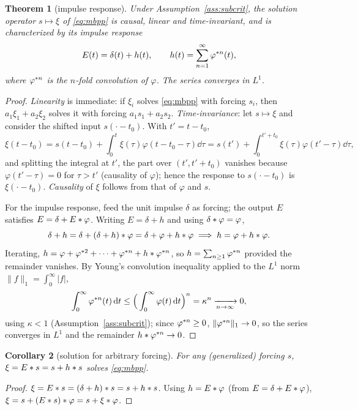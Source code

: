 \documentclass[11pt]{article}
\theoremstyle{plain}
\newtheorem{theorem}{Theorem}[section]
\newtheorem{corollary}[theorem]{Corollary}
\theoremstyle{definition}
\theoremstyle{remark}
\begin{document}
\begin{theorem}[impulse response]
\label{thm:impulse}
Under Assumption~\ref{ass:subcrit}, the solution operator $s\mapsto\xi$ of
\eqref{eq:mbpp} is causal, linear and time-invariant, and is characterized by its
impulse response
\begin{equation}
E(t)=\delta(t)+h(t),\qquad h(t)=\sum_{n=1}^\infty\varphi^{\ast n}(t),
\label{eq:impulse}
\end{equation}
where $\varphi^{\ast n}$ is the $n$-fold convolution of $\varphi$. The series
converges in $L^1$.
\end{theorem}
\begin{proof}
\emph{Linearity} is immediate: if $\xi_i$ solves \eqref{eq:mbpp} with forcing
$s_i$, then $a_1\xi_1+a_2\xi_2$ solves it with forcing $a_1s_1+a_2s_2$.
\emph{Time-invariance}: let $s\mapsto\xi$ and consider the shifted input
$s(\cdot-t_0)$. With $t'=t-t_0$,
\[
\xi(t-t_0)=s(t-t_0)+\int_0^t\xi(\tau)\varphi(t-t_0-\tau)\dd\tau
=s(t')+\int_0^{t'+t_0}\xi(\tau)\varphi(t'-\tau)\dd\tau,
\]
and splitting the integral at $t'$, the part over $(t',t'+t_0)$ vanishes because
$\varphi(t'-\tau)=0$ for $\tau>t'$ (causality of $\varphi$); hence the response to
$s(\cdot-t_0)$ is $\xi(\cdot-t_0)$. \emph{Causality} of $\xi$ follows from that of
$\varphi$ and $s$.

For the impulse response, feed the unit impulse $\delta$ as forcing; the output
$E$ satisfies $E=\delta+E\ast\varphi$. Writing $E=\delta+h$ and using
$\delta\ast\varphi=\varphi$,
\[
\delta+h=\delta+(\delta+h)\ast\varphi=\delta+\varphi+h\ast\varphi
\;\Longrightarrow\; h=\varphi+h\ast\varphi.
\]
Iterating, $h=\varphi+\varphi^{\ast2}+\dots+\varphi^{\ast n}+h\ast\varphi^{\ast n}$,
so $h=\sum_{n\ge1}\varphi^{\ast n}$ provided the remainder vanishes. By Young's
convolution inequality applied to the $L^1$ norm $\|f\|_1=\int_0^\infty|f|$,
\[
\int_0^\infty\varphi^{\ast n}(t)\,\mathrm{d} t\le\Big(\int_0^\infty\varphi(t)\,\mathrm{d} t\Big)^n=\kappa^n\xrightarrow[n\to\infty]{}0,
\]
using $\kappa<1$ (Assumption~\ref{ass:subcrit}); since $\varphi^{\ast n}\ge0$,
$\|\varphi^{\ast n}\|_1\to0$, so the series converges in $L^1$ and the remainder
$h\ast\varphi^{\ast n}\to0$.
\end{proof}

\begin{corollary}[solution for arbitrary forcing]
\label{cor:solution}
For any (generalized) forcing $s$, $\xi=E\ast s=s+h\ast s$ solves
\eqref{eq:mbpp}.
\end{corollary}
\begin{proof}
$\xi=E\ast s=(\delta+h)\ast s=s+h\ast s$. Using $h=E\ast\varphi$ (from
$E=\delta+E\ast\varphi$), $\xi=s+(E\ast s)\ast\varphi=s+\xi\ast\varphi$.
\end{proof}
\end{document}
